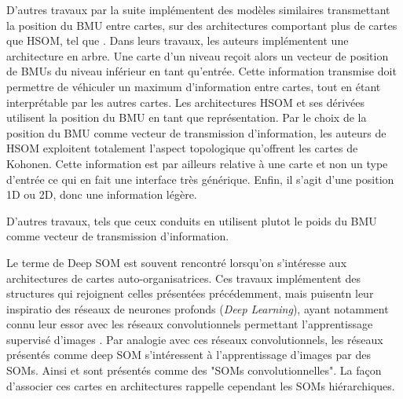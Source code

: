 \documentclass[../main]{subfiles}
\begin{document}
D'autres travaux par la suite implémentent des modèles similaires transmettant la position du BMU entre cartes, sur des architectures comportant plus de cartes que HSOM, tel que \cite{hagenauer_hierarchical_2013, Paplinski2005MultimodalFS}. Dans leurs travaux, les auteurs implémentent une architecture en arbre. Une carte d'un niveau reçoit alors un vecteur de position de BMUs du niveau inférieur en tant qu'entrée.
Cette information transmise doit permettre de véhiculer un maximum d'information entre cartes, tout en étant interprétable par les autres cartes. Les architectures HSOM et ses dérivées utilisent la position du BMU en tant que représentation. Par le choix de la position du BMU comme vecteur de transmission d'information, les auteurs de HSOM exploitent totalement l'aspect topologique qu'offrent les cartes de Kohonen. Cette information est par ailleurs relative à une carte et non un type d'entrée ce qui en fait une interface très générique. Enfin, il s'agit d'une position 1D ou 2D, donc une information légère.

D'autres travaux, tels que ceux conduits en \cite{wang_comparisonal_2007, gunes_kayacik_hierarchical_2007} utilisent plutot le poids du BMU comme  vecteur de transmission d'information.


Le terme de Deep SOM est souvent rencontré lorsqu'on s'intéresse aux architectures de cartes auto-organisatrices.
Ces travaux implémentent des structures qui rejoignent celles présentées précédemment, mais puisentn leur inspiratio des réseaux de neurones profonds (\emph{Deep Learning}), ayant notamment connu leur essor avec les réseaux convolutionnels permettant l'apprentissage supervisé d'images \cite{lecun_deep_2015}.
Par analogie avec ces réseaux convolutionnels, les réseaux présentés comme deep SOM s'intéressent à l'apprentissage d'images par des SOMs. Ainsi \cite{Liu2015DeepSM,hankins_somnet_2018,wickramasinghe_deep_2019,aly_deep_2020,sakkari_convolutional_2020,dozono_convolutional_2016,nawaratne_hierarchical_2020-1,mici_self-organizing_2018} et sont présentés comme des "SOMs convolutionnelles".
La façon d'associer ces cartes en architectures rappelle cependant les SOMs hiérarchiques.
\end{document}
